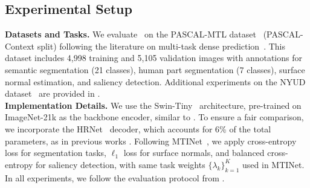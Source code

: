 \subsection{Experimental Setup}
\label{subsec:expsetup}
\noindent\textbf{Datasets and Tasks.} We evaluate \ourmethod\ on the PASCAL-MTL dataset~\citep{pascal} (PASCAL-Context split) following the literature on multi-task dense prediction~\citep{vandenhende2020mti, xu2018pad, ye2022inverted}. This dataset includes 4,998 training and 5,105 validation images with annotations for semantic segmentation (21 classes), human part segmentation (7 classes), surface normal estimation, and saliency detection. Additional experiments on the  NYUD dataset~\citep{silberman2012indoor} are provided in .
\\
\noindent\textbf{Implementation Details.} We use the Swin-Tiny~\citep{liu2021swin} architecture, pre-trained on ImageNet-21k \cite{russakovsky2015imagenet} as the backbone encoder, similar to \cite{agiza2024mtlora}. To ensure a fair comparison, we incorporate the HRNet~\citep{hr_net} decoder, which accounts for 6\% of the total parameters, as in previous works \cite{agiza2024mtlora,vandenhende2020mti}.  Following MTINet~\citep{vandenhende2020mti}, we apply cross-entropy loss for segmentation tasks, $\ell_1$ loss for surface normals, and balanced cross-entropy \cite{cui2019classbalancedlossbasedeffective} for saliency detection, with same task weights $\{\lambda_k\}_{k=1}^K$ used in MTINet. In all experiments, we follow the evaluation protocol from \citet{agiza2024mtlora}.

